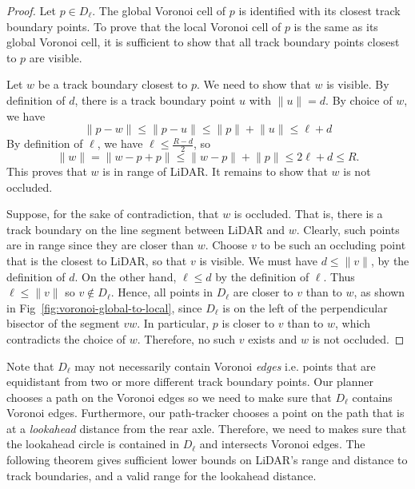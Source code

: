 \begin{proof}
Let $p \in D_\ell$.
%
The global Voronoi cell of $p$ is identified with its closest track boundary points.
%
To prove that the local Voronoi cell of $p$ is the same as its global Voronoi cell, it is sufficient to show that all track boundary points closest to $p$ are visible.


Let $w$ be a track boundary closest to $p$.
%
We need to show that $w$ is visible.
%
By definition of $d$, there is a track boundary point $u$ with $\lVert u \rVert = d$.
%
By choice of $w$, we have
$$
\lVert p - w \rVert 
\leq \lVert p - u \rVert 
\leq \lVert p \rVert + \lVert u \rVert \leq \ell + d
$$
%
By definition of $\ell$, we have $\ell \leq \frac{R-d}{2}$, so
$$
\lVert w \rVert = \lVert w - p + p \rVert \leq \lVert w-p \rVert + \lVert p \rVert \leq 2\ell+d \leq R.
$$
%
This proves that $w$ is in range of LiDAR.
%
It remains to show that $w$ is not occluded.

Suppose, for the sake of contradiction, that $w$ is occluded.
%
That is,
there is a track boundary on the line segment between LiDAR and $w$.
%
Clearly, such points are in range since they are closer than $w$.
%
Choose $v$ to be such an occluding point that is the closest to LiDAR, so that $v$ is visible.
%
We must have $d \leq \lVert v \rVert $, by the definition of $d$.
%
On the other hand, $\ell \leq d$ by the definition of $\ell$.
%
Thus $\ell \leq \lVert v \rVert $ so $v \not\in D_\ell$.
%
Hence, all points in $D_\ell$ are closer to $v$ than to $w$, as shown in Fig~\ref{fig:voronoi-global-to-local}, since $D_\ell$ is on the left of the perpendicular bisector of the segment $vw$. 
%
In particular, $p$ is closer to $v$ than to $w$, which contradicts the choice of $w$.
%
Therefore, no such $v$ exists and $w$ is not occluded.
\end{proof}

Note that $D_\ell$ may not necessarily contain Voronoi \emph{edges} i.e. points that are equidistant from two or more different track boundary points.
%
Our planner chooses a path on the Voronoi edges so we need to make sure that $D_\ell$ contains Voronoi edges.
%
Furthermore, our path-tracker chooses a point on the path that is at a \emph{lookahead} distance from the rear axle.
%
Therefore, we need to makes sure that the lookahead circle is contained in $D_\ell$ and intersects Voronoi edges.
%
The following theorem gives sufficient lower bounds on LiDAR's range and distance to track boundaries, and a valid range for the lookahead distance.


